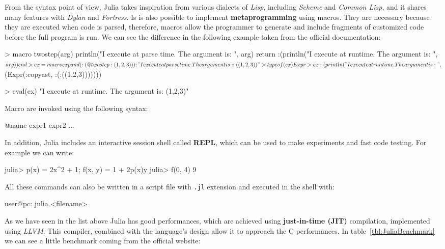 From the syntax point of view, Julia takes inspiration from various dialects of \textit{Lisp}, including \textit{Scheme} and \textit{Common Lisp}, and it shares many features with \textit{Dylan} and \textit{Fortress}. Is is also possible to implement \textbf{metaprogramming} using macros. They are necessary because they are executed when code is parsed, therefore, macros allow the programmer to generate and include fragments of customized code before the full program is run. We can see the difference in the following example taken from the official documentation:

\begin{julia}
 > macro twostep(arg)
     println("I execute at parse time. The argument
             is: ", arg)
     return :(println("I execute at runtime. 
            The argument is: ", $arg))
   end
 
 > ex = macroexpand( :(@twostep :(1, 2, 3)) );
   "I execute at parse time. The argument
      is: :((1,2,3))"
 
 > typeof(ex)
   Expr

 > ex
   :(println("I execute at runtime. The argument is: 
     ",$(Expr(:copyast, :(:((1,2,3)))))))

 > eval(ex)
   "I execute at runtime. The argument is: (1,2,3)"
\end{julia}

Macro are invoked using the following syntax:
\begin{julia}
 @name expr1 expr2 ...
\end{julia}

In addition, Julia includes an interactive session shell called \textbf{REPL}, which can be used to make experiments and fast code testing. For example we can write:
\begin{julia}
 julia> p(x) = 2x^2 + 1; f(x, y) = 1 + 2p(x)y
 julia> f(0, 4)
 9
\end{julia}

All these commands can also be written in a script file with \texttt{.jl} extension and executed in the shell with:
\begin{julia}
 user@pc: julia <filename>
\end{julia}

As we have seen in the list above Julia has good performances, which are achieved using \textbf{just-in-time (JIT)} compilation, implemented using \textit{LLVM}. This compiler, combined with the language's design allow it to approach the C performances. In table~\ref{tbl:JuliaBenchmark} we can see a little benchmark coming from the official website:


